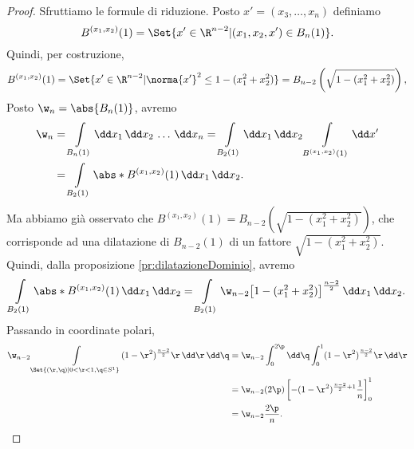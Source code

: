 \begin{proof}
	Sfruttiamo le formule di riduzione.
	Posto \(x'=(x_3,\ldots,x_n)\) definiamo
	\[
		B^{(x_1,x_2)}(1) = \Set{x'\in\R^{n-2} | (x_1,x_2,x') \in B_n(1)}.
	\]
	Quindi, per costruzione,
	\[
		B^{(x_1,x_2)}(1) = \Set{x'\in\R^{n-2} | \norma{x'}^2 \le 1-(x_1^2+x_2^2)}=B_{n-2}\left(\sqrt{1-(x_1^2+x_2^2)}\right),
	\]
	Posto \(\w_n = \abs{B_n(1)}\), avremo
	\[
		\begin{split}
			\w_n & = \int\limits_{B_n(1)}\dd x_1\,\dd x_2\,\ldots\,\dd x_n = \int\limits_{B_2(1)}\dd x_1\,\dd x_2 \int\limits_{B^{(x_1,x_2)}(1)}\dd x'\\
			& = \int\limits_{B_2(1)}\abs*{B^{(x_1,x_2)}(1)}\,\dd x_1\,\dd x_2.
		\end{split}
	\]
	Ma abbiamo già osservato che \(B^{(x_1,x_2)}(1)=B_{n-2}\left(\sqrt{1-(x_1^2+x_2^2)}\right)\), che corrisponde ad una dilatazione di \(B_{n-2}(1)\) di un fattore \(\sqrt{1-(x_1^2+x_2^2)}\).
	Quindi, dalla proposizione \ref{pr:dilatazioneDominio}, avremo
	\[
		\int\limits_{B_2(1)}\abs*{B^{(x_1,x_2)}(1)}\,\dd x_1\,\dd x_2 = \int\limits_{B_2(1)}\w_{n-2}\big[1-(x_1^2+x_2^2)\big]^{\frac{n-2}{2}}\,\dd x_1\,\dd x_2.
	\]
	Passando in coordinate polari,
	\[
		\begin{split}
			\w_{n-2}\int\limits_{\Set{(\r,\q) | 0<\r<1,\q\in S^1}} (1-\r^2)^{\frac{n-2}{2}}\r\,\dd \r\,\dd \q & = \w_{n-2}\int_0^{2\p}\dd\q\int_0^1 (1-\r^2)^{\frac{n-2}{2}}\r\,\dd\r\\
			& = \w_{n-2}(2\p)\left[ -(1-\r^2)^{\frac{n-2}{2}+1}\frac{1}{n} \right]_0^1\\
			& = \w_{n-2} \frac{2\p}{n}.\qedhere
		\end{split}
	\]
\end{proof}
%
%

